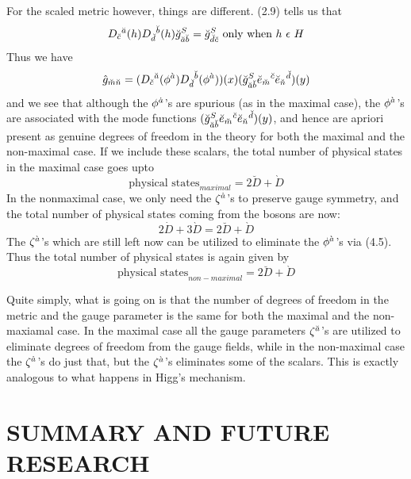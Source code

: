 \documentclass[a4paper,12pt]{article}
\begin{document}
For the scaled metric however, things are different. (2.9) tells us that 
$$D_{\breve{c}}{}^{\breve{a}}(h)D_{\breve{d}}{}^{\breve{b}}(h)\breve{g}_{\breve{a}\breve{b}}^{S}=\breve{g}_{\breve{d}\breve{c}}^{S} \mbox{ only when } h\ \epsilon\ H$$
Thus we have 
\begin{equation}
\hat{g}_{\breve{m}\breve{n}}=(D_{\breve{c}}{}^{\breve{a}}(\phi^{\grave{a}})D_{\breve{d}}{}^{\breve{b}}(\phi^{\grave{a}}))(x)(\breve{g}_{\breve{a}\breve{b}}^S\breve{e}_{\breve{m}}{}^{\breve{c}}\breve{e}_{\breve{n}}{}^{\breve{d}})(y)
\end{equation}
and we see that although the $\phi^{\dot{a}}$'s are spurious (as in the maximal case), the $\phi^{\grave{a}}$'s are associated with the mode functions $(\breve{g}_{\breve{a}\breve{b}}^S\breve{e}_{\breve{m}}{}^{\breve{c}}\breve{e}_{\breve{n}}{}^{\breve{d}})(y)$, and hence are apriori present as genuine degrees of freedom in the theory for both the maximal and the non-maximal case. If we include these scalars, the total number of physical states in the maximal case goes upto
\begin{equation}
\mbox{physical states}_{maximal}=2\breve{D}+\grave{D}
\end{equation}
In the nonmaximal case, we only need the $\zeta^{\dot{a}}$'s to preserve gauge symmetry, and the total number of physical states coming from the bosons are now:
$$2\dot{D}+3\grave{D}=2\breve{D}+\grave{D}$$
The $\zeta^{\grave{a}}$'s which are still left now can be utilized to eliminate the $\phi^{\grave{a}}$'s via (4.5). Thus the total number of physical states is again given by
\begin{equation}
\mbox{physical states}_{non-maximal}=2\breve{D}+\grave{D}
\end{equation}

Quite simply,  what is going on is that the number of degrees of freedom in the metric and the gauge parameter is the same for both the maximal and the non-maxiamal case. In the maximal case all the gauge parameters $\zeta^{\breve{a}}$'s are utilized to eliminate degrees of freedom from the gauge fields, while in the non-maximal case the $\zeta^{\dot{a}}$'s do just that, but the $\zeta^{\grave{a}}$'s eliminates some of the scalars. This is exactly analogous to what happens in Higg's mechanism. 

\section{{\bf SUMMARY AND FUTURE RESEARCH}} 
\end{document}
